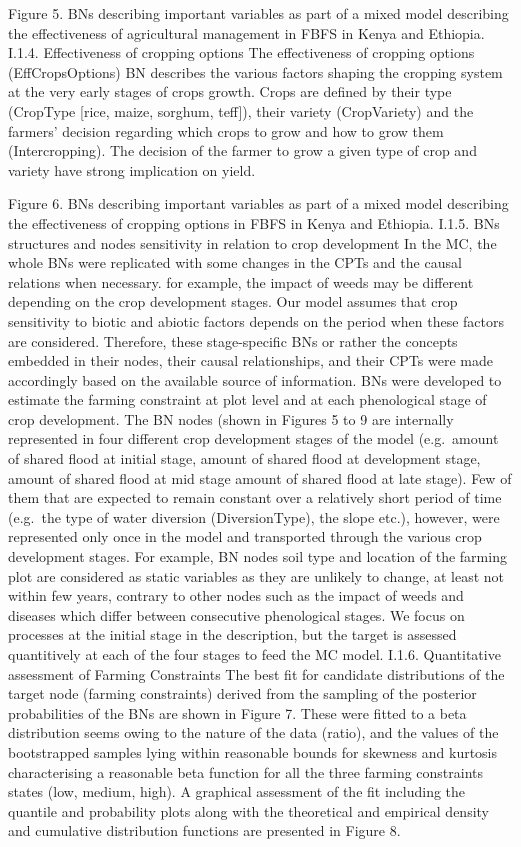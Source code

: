 \documentclass[12pt,oneside]{article}
\begin{document}
Figure 5. BNs describing important variables as part of a mixed model describing the effectiveness of agricultural management in FBFS in Kenya and Ethiopia.
I.1.4. Effectiveness of cropping options
The effectiveness of cropping options (EffCropsOptions) BN describes the various factors shaping the cropping system at the very early stages of crops growth. Crops are defined by their type (CropType {[}rice, maize, sorghum, teff{]}), their variety (CropVariety) and the farmers' decision regarding which crops to grow and how to grow them (Intercropping). The decision of the farmer to grow a given type of crop and variety have strong implication on yield.

Figure 6. BNs describing important variables as part of a mixed model describing the effectiveness of cropping options in FBFS in Kenya and Ethiopia.
I.1.5. BNs structures and nodes sensitivity in relation to crop development
In the MC, the whole BNs were replicated with some changes in the CPTs and the causal relations when necessary. for example, the impact of weeds may be different depending on the crop development stages. Our model assumes that crop sensitivity to biotic and abiotic factors depends on the period when these factors are considered. Therefore, these stage-specific BNs or rather the concepts embedded in their nodes, their causal relationships, and their CPTs were made accordingly based on the available source of information. BNs were developed to estimate the farming constraint at plot level and at each phenological stage of crop development. The BN nodes (shown in Figures 5 to 9 are internally represented in four different crop development stages of the model (e.g.~amount of shared flood at initial stage, amount of shared flood at development stage, amount of shared flood at mid stage amount of shared flood at late stage). Few of them that are expected to remain constant over a relatively short period of time (e.g.~the type of water diversion (DiversionType), the slope etc.), however, were represented only once in the model and transported through the various crop development stages. For example, BN nodes soil type and location of the farming plot are considered as static variables as they are unlikely to change, at least not within few years, contrary to other nodes such as the impact of weeds and diseases which differ between consecutive phenological stages. We focus on processes at the initial stage in the description, but the target is assessed quantitively at each of the four stages to feed the MC model.
I.1.6. Quantitative assessment of Farming Constraints
The best fit for candidate distributions of the target node (farming constraints) derived from the sampling of the posterior probabilities of the BNs are shown in Figure 7. These were fitted to a beta distribution seems owing to the nature of the data (ratio), and the values of the bootstrapped samples lying within reasonable bounds for skewness and kurtosis characterising a reasonable beta function for all the three farming constraints states (low, medium, high). A graphical assessment of the fit including the quantile and probability plots along with the theoretical and empirical density and cumulative distribution functions are presented in Figure 8.
\end{document}
